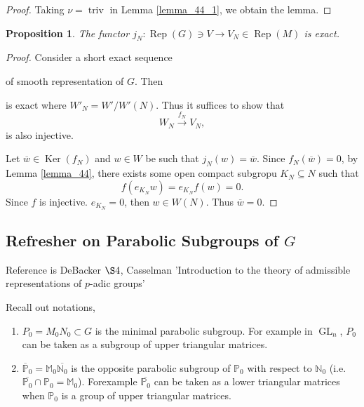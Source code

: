 \documentclass[8pt]{article}
\newtheorem{proposition}{Proposition}[section]
\DeclareMathOperator{\triv}{triv}
\DeclareMathOperator{\GL}{GL}
\DeclareMathOperator{\Rep}{Rep}
\DeclareMathOperator{\Ker}{Ker}
\newcommand{\N}[0]{\mathbb{N}}
\newcommand{\Para}[0]{\mathbb{P}}
\newcommand{\M}[0]{\mathbb{M}}
\begin{document}
\begin{proof}
Taking $\nu=\triv$ in Lemma \ref{lemma_44_1}, we obtain the lemma.
\end{proof}

\begin{proposition}
  \label{proposition_45}
  The functor $j_N:\Rep(G)\ni V\to V_N\in\Rep(M)$ is exact.
\end{proposition}

\begin{proof}
  Consider a short exact sequence
  \begin{center}
  \end{center}
  of smooth representation of $G$. Then 
  \begin{center}
  \end{center}
  is exact where $W'_N = W'/W'(N)$. Thus it suffices to show that 
  \begin{equation*}
    W_N\stackrel{f_N}{\to} V_N,
  \end{equation*}
  is also injective.
  \par Let $\overline{w}\in\Ker(f_N)$ and $w\in W$ be such that $j_N(w) = \overline{w}$. Since $f_N(\overline{w}) = 0$, by Lemma \ref{lemma_44}, there exists some open compact subgropu $K_N\subseteq N$ such that 
  \begin{equation*}
    f(e_{K_N}w) = e_{K_N}f(w) = 0.
  \end{equation*}
  Since $f$ is injective. $e_{K_N} = 0$, then $w\in W(N)$. Thus $\overline{w}=0$.
\end{proof}

\subsection{Refresher on Parabolic Subgroups of $G$}

Reference is DeBacker $\S4$, Casselman 'Introduction to the theory of admissible representations of $p$-adic groups'
\par Recall out notations, 
\begin{enumerate}
  \item $P_0=M_0N_0\subset G$ is the minimal parabolic subgroup. For example in $\GL_n$, $P_0$ can be taken as a subgroup of upper triangular matrices.
  \item $\overline{\Para}_0 = \M_0\overline{\N_0}$ is the opposite parabolic subgroup of $\Para_0$ with respect to $\N_0$ (i.e. $\overline{\Para_0}\cap\Para_0 = \M_0$). Forexample $\overline{\Para_0}$ can be taken as a lower triangular matrices when $\Para_0$ is a group of upper triangular matrices.
\end{enumerate}
\end{document}
